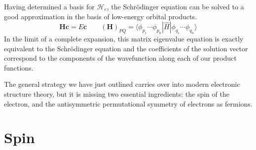 Having determined a basis for \(\mathcal{H}_e\), the Schr\"odinger equation can
be solved to a good approximation in the basis of low-energy orbital products.
\begin{equation}
    \mathbf{H}\mathbf{c}
    =
    E\mathbf{c}
    \qquad
    (\mathbf{H})_{PQ}
    =
    \langle \phi_{p_1}\cdots \phi_{p_n}|
    \hat{H}
    |\phi_{q_1}\cdots \phi_{q_n} \rangle
\end{equation}
In the limit of a complete expansion, this matrix eigenvalue equation is exactly
equivalent to the Schr\"odinger equation and the coefficients of the solution
vector correspond to the components of the wavefunction along each of our
product functions.

The general strategy we have just outlined carries over into modern electronic
structure theory, but it is missing two essential ingredients: the spin of the
electron, and the antisymmetric permutational symmetry of electrons as fermions.


\section{Spin}


